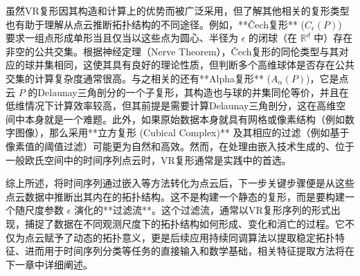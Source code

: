 虽然VR复形因其构造和计算上的优势而被广泛采用，但了解其他相关的复形类型也有助于理解从点云推断拓扑结构的不同途径。例如，**Čech复形** ($C_\epsilon(P)$) 要求一组点形成单形当且仅当以这些点为圆心、半径为 $\epsilon$ 的闭球（在 $\mathbb{R}^d$ 中）存在非空的公共交集。根据神经定理（Nerve Theorem），Čech复形的同伦类型与其对应的球并集相同，这使其具有良好的理论性质，但判断多个高维球体是否存在公共交集的计算复杂度通常很高。与之相关的还有**Alpha复形** ($A_\alpha(P)$)，它是点云 $P$ 的Delaunay三角剖分的一个子复形，其构造也与球的并集同伦等价，并且在低维情况下计算效率较高，但其前提是需要计算Delaunay三角剖分，这在高维空间中本身就是一个难题。此外，如果原始数据本身就具有网格或像素结构（例如数字图像），那么采用**立方复形 (Cubical Complex)** 及其相应的过滤（例如基于像素值的阈值过滤）可能更为自然和高效。然而，在处理由嵌入技术生成的、位于一般欧氏空间中的时间序列点云时，VR复形通常是实践中的首选。

综上所述，将时间序列通过嵌入等方法转化为点云后，下一步关键步骤便是从这些点云数据中推断出其内在的拓扑结构。这不是构建一个静态的复形，而是要构建一个随尺度参数 $\epsilon$ 演化的**过滤流**。这个过滤流，通常以VR复形序列的形式出现，捕捉了数据在不同观测尺度下的拓扑结构如何形成、变化和消亡的过程。它不仅为点云赋予了动态的拓扑意义，更是后续应用持续同调算法以提取稳定拓扑特征、进而用于时间序列分类等任务的直接输入和数学基础，相关特征提取方法将在下一章中详细阐述。

